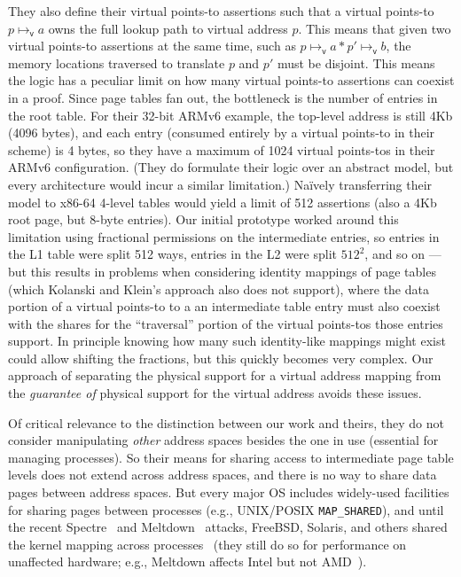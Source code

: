 They also define their virtual points-to assertions such that a virtual points-to $p\mapsto_\mathsf{v} a$ owns the full lookup path to virtual address $p$. This means that given two virtual points-to assertions at the same time, such as $p\mapsto_\mathsf{v}a \ast p'\mapsto_\mathsf{v}b$, the memory locations traversed to translate $p$ and $p'$ must be disjoint. This means the logic has a peculiar limit on how many virtual points-to assertions can coexist in a proof. Since page tables fan out, the bottleneck is the number of entries in the root table. For their 32-bit ARMv6 example, the top-level address is still 4Kb (4096 bytes), and each entry (consumed entirely by a virtual points-to in their scheme) is 4 bytes, so they have a maximum of 1024 virtual points-tos in their ARMv6 configuration. (They do formulate their logic over an abstract model, but every architecture would incur a similar limitation.) Na\"ively transferring their model to x86-64 4-level tables would yield a limit of 512 assertions (also a 4Kb root page, but 8-byte entries). Our initial prototype worked around this limitation using fractional permissions on the intermediate entries, so entries in the L1 table were split 512 ways, entries in the L2 were split $512^2$, and so on --- but this results in problems when considering identity mappings of page tables (which Kolanski and Klein's approach also does not support), where the data portion of a virtual points-to to a an intermediate table entry must also coexist with the shares for the ``traversal'' portion of the virtual points-tos those entries support. In principle knowing how many such identity-like mappings might exist could allow shifting the fractions, but this quickly becomes very complex.
Our approach of separating the physical support for a virtual address mapping from the \emph{guarantee of} physical support for the virtual address avoids these issues.


Of critical relevance to the distinction between our work and theirs, they do not consider
manipulating \emph{other} address spaces besides the one in use (essential for managing
processes).
So their means for sharing access to intermediate page table levels does not extend across address spaces, and there is no way to share data pages between address spaces.  But every major OS includes widely-used facilities for sharing pages between processes (e.g., UNIX/POSIX \texttt{MAP\_SHARED}), and until the recent Spectre~\cite{kocher2018spectre} and Meltdown~\cite{lipp2018meltdown} attacks, FreeBSD, Solaris, and others shared the kernel mapping across processes~\cite{mckusick2014design,mcdougall2006solaris,wininternals6a,wininternals6b} (they still do so for performance on unaffected hardware; e.g., Meltdown affects Intel but not AMD~\cite{amdmeltdown}).

